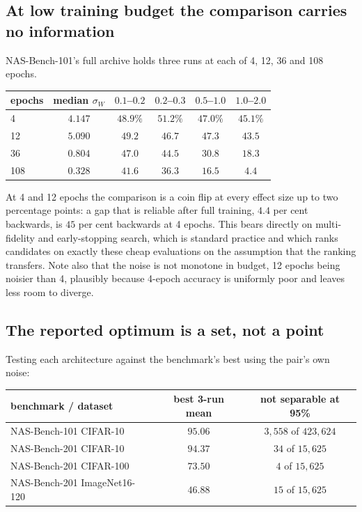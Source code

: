 \documentclass[11pt]{article}
\begin{document}
\subsection{At low training budget the comparison carries no information}

NAS-Bench-101's full archive holds three runs at each of 4, 12, 36 and 108 epochs.

\begin{center}\small
\begin{tabular}{lccccc}
\toprule
epochs & median $\sigma_W$ & $0.1$--$0.2$ & $0.2$--$0.3$ & $0.5$--$1.0$ & $1.0$--$2.0$ \\
\midrule
4   & $4.147$ & $48.9\%$ & $51.2\%$ & $47.0\%$ & $45.1\%$ \\
12  & $5.090$ & $49.2$   & $46.7$   & $47.3$   & $43.5$ \\
36  & $0.804$ & $47.0$   & $44.5$   & $30.8$   & $18.3$ \\
108 & $0.328$ & $41.6$   & $36.3$   & $16.5$   & $4.4$ \\
\bottomrule
\end{tabular}
\end{center}

At 4 and 12 epochs the comparison is a coin flip at every effect size up to two percentage points: a
gap that is reliable after full training, $4.4$ per cent backwards, is $45$ per cent backwards at 4
epochs. This bears directly on multi-fidelity and early-stopping search, which is standard practice and
which ranks candidates on exactly these cheap evaluations on the assumption that the ranking transfers.
Note also that the noise is not monotone in budget, 12 epochs being noisier than 4, plausibly because
4-epoch accuracy is uniformly poor and leaves less room to diverge.

\subsection{The reported optimum is a set, not a point}

Testing each architecture against the benchmark's best using the pair's own noise:

\begin{center}\small
\begin{tabular}{lcc}
\toprule
benchmark / dataset & best 3-run mean & not separable at 95\% \\
\midrule
NAS-Bench-101 CIFAR-10        & $95.06$ & $3{,}558$ of $423{,}624$ \\
NAS-Bench-201 CIFAR-10        & $94.37$ & $34$ of $15{,}625$ \\
NAS-Bench-201 CIFAR-100       & $73.50$ & $4$ of $15{,}625$ \\
NAS-Bench-201 ImageNet16-120  & $46.88$ & $15$ of $15{,}625$ \\
\bottomrule
\end{tabular}
\end{center}
\end{document}
